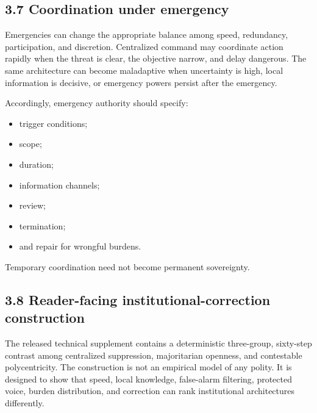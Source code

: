 \documentclass[
  11pt,
]{article}
\providecommand{\tightlist}{%
  \setlength{\itemsep}{0pt}\setlength{\parskip}{0pt}}
\begin{document}
\subsection{3.7 Coordination under
emergency}\label{coordination-under-emergency}

Emergencies can change the appropriate balance among speed, redundancy,
participation, and discretion. Centralized command may coordinate action
rapidly when the threat is clear, the objective narrow, and delay
dangerous. The same architecture can become maladaptive when uncertainty
is high, local information is decisive, or emergency powers persist
after the emergency.

Accordingly, emergency authority should specify:

\begin{itemize}
\tightlist
\item
  trigger conditions;
\item
  scope;
\item
  duration;
\item
  information channels;
\item
  review;
\item
  termination;
\item
  and repair for wrongful burdens.
\end{itemize}

Temporary coordination need not become permanent sovereignty.

\subsection{3.8 Reader-facing institutional-correction
construction}\label{reader-facing-institutional-correction-construction}

The released technical supplement contains a deterministic three-group,
sixty-step contrast among centralized suppression, majoritarian
openness, and contestable polycentricity. The construction is not an
empirical model of any polity. It is designed to show that speed, local
knowledge, false-alarm filtering, protected voice, burden distribution,
and correction can rank institutional architectures differently.
\end{document}
